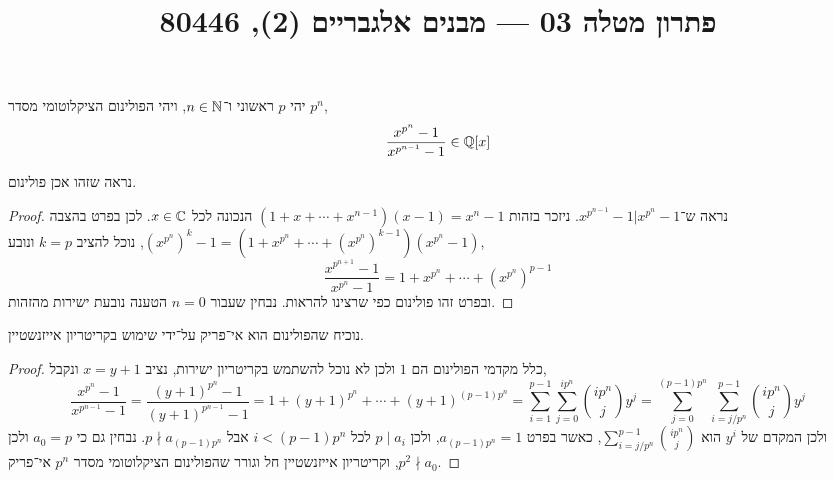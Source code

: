 
\title{פתרון מטלה 03 --- מבנים אלגבריים (2), 80446}


\maketitle
\maketitleprint{}

\question{}
יהי $p$ ראשוני ו־$n \in \mathbb{N}$, ויהי הפולינום הציקלוטומי מסדר $p^n$,
\[
	\frac{x^{p^n} - 1}{x^{p^{n - 1}} - 1}
	\in \mathbb{Q}[x]
\]

\subquestion{}
נראה שזהו אכן פולינום.
\begin{proof}
	נראה ש־$x^{p^{n - 1}} - 1 | x^{p^n} - 1$.
	ניזכר בזהות $(1 + x + \cdots + x^{n - 1})(x - 1) = x^n - 1$ הנכונה לכל $x \in \mathbb{C}$.
	לכן בפרט בהצבה ${(x^{p^n})}^k - 1 = (1 + x^{p^n} + \cdots + {(x^{p^n})}^{k - 1}) (x^{p^n} - 1)$, נוכל להציב $k = p$ ונובע,
	\[
		\frac{x^{p^{n + 1}} - 1}{x^{p^n} - 1}
		= 1 + x^{p^n} + \cdots + {(x^{p^n})}^{p - 1}
	\]
	ובפרט זהו פולינום כפי שרצינו להראות.
	נבחין שעבור $n = 0$ הטענה נובעת ישירות מהזהות.
\end{proof}

\subquestion{}
נוכיח שהפולינום הוא אי־פריק על־ידי שימוש בקריטריון אייזנשטיין.
\begin{proof}
	כלל מקדמי הפולינום הם $1$ ולכן לא נוכל להשתמש בקריטריון ישירות, נציב $x = y + 1$ ונקבל,
	\[
		\frac{x^{p^n} - 1}{x^{p^{n - 1}} - 1}
		= \frac{{(y + 1)}^{p^n} - 1}{{(y + 1)}^{p^{n - 1}} - 1}
		= 1 + {(y + 1)}^{p^n} + \cdots + {(y + 1)}^{(p - 1) p^n}
		= \sum_{i = 1}^{p - 1} \sum_{j = 0}^{i p^n} \binom{i p^n}{j} y^j
		= \sum_{j = 0}^{(p - 1) p^n} \sum_{i = j / p^n}^{p - 1} \binom{i p^n}{j} y^j
	\]
	ולכן המקדם של $y^i$ הוא $\sum_{i = j / p^n}^{p - 1} \binom{i p^n}{j}$, כאשר בפרט $a_{(p - 1)p^n} = 1$, ולכן $p \mid a_i$ לכל $i < (p - 1) p^n$ אבל $p \nmid a_{(p - 1) p^n}$.
	נבחין גם כי $a_0 = p$ ולכן $p^2 \nmid a_0$, וקריטריון אייזנשטיין חל וגורר שהפולינום הציקלוטומי מסדר $p^n$ אי־פריק.
\end{proof}

